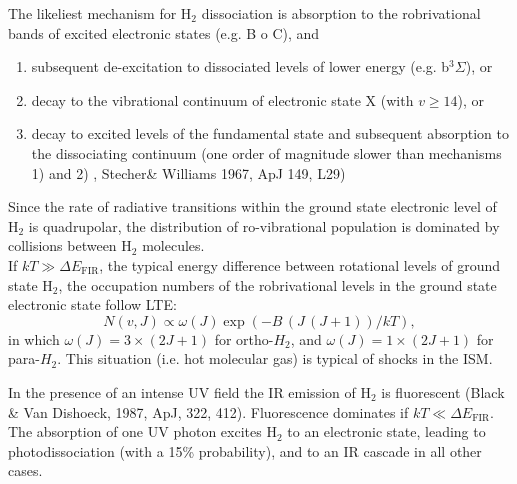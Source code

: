 
The likeliest mechanism for H$_2$ dissociation is absorption to the
robrivational bands of excited electronic states (e.g. B o C), and
\begin{enumerate}
\item subsequent  de-excitation to dissociated levels of lower energy
 (e.g. b$^3\Sigma$), or \label{it:1mecah2}
\item  decay to the vibrational continuum of electronic state X (with
$v \ge 14$), or  \label{it:2mecah2}
\item decay to excited levels of the fundamental state and subsequent
absorption to the dissociating continuum (one order of magnitude
slower than mechanisms 1) and 2)  
, Stecher\& Williams 1967, ApJ 149, L29)
\end{enumerate}
  

Since the rate of radiative transitions within the ground state
electronic level of H$_2$ is quadrupolar, the distribution of
ro-vibrational population is dominated by collisions between H$_2$
molecules. \\

If $kT \gg \Delta E_\mathrm{FIR}$, the typical energy difference between
rotational levels of ground state H$_2$, the occupation numbers of the
robrivational levels in the ground state electronic state follow LTE:
\[ N(v,J) \propto \omega(J) \exp(-B\,(J\,(J+1))/kT), \]
in which $\omega(J) = 3 \times (2J+1) $ for ortho-$H_2$, and $\omega(J)
= 1 \times (2J+1) $ for para-$H_2$. This situation (i.e. hot molecular
gas) is typical of shocks in the ISM.

In the presence of an intense UV field the IR emission of H$_2$ is
fluorescent (Black \& Van Dishoeck, 1987, ApJ, 322, 412). Fluorescence
dominates if $kT \ll \Delta E_\mathrm{FIR}$. The absorption of one UV
photon excites H$_2$ to an electronic state, leading to
photodissociation (with a 15\% probability), and to an IR cascade in
all other cases.






